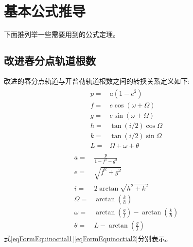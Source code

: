 \section{基本公式推导}
下面推列举一些需要用到的公式定理。

\subsection{改进春分点轨道根数}
改进的春分点轨道与开普勒轨道根数之间的转换关系定义如下\cite{mxubo2016}:
\begin{align}
    \begin{aligned}
        p =& a\left(1-e^{2}\right) \\
        f =& e \cos (\omega+\Omega) \\
        g =& e \sin (\omega+\Omega) \\
        h =& \tan (i / 2) \cos \Omega \\
        k =& \tan (i / 2) \sin \Omega \\
        L =& \Omega+\omega+\theta
    \end{aligned} \label{eqFormEquinoctial1}
\end{align}
\begin{align}
    \begin{aligned}
        a =& \frac{p}{1-f^{2}-g^{2}} \\
        e =& \sqrt{f^{2}+g^{2}} \\
        i =& 2 \arctan \sqrt{h^{2}+k^{2}} \\
        \Omega =& \arctan \left(\frac{k}{h}\right) \\
        \omega =& \arctan \left(\frac{g}{f}\right)-\arctan \left(\frac{k}{h}\right) \\
        \theta =& L-\arctan \left(\frac{g}{f}\right)
    \end{aligned} \label{eqFormEquinoctial2}
\end{align}
式\eqref{eqFormEquinoctial1}\eqref{eqFormEquinoctial2}分别表示。

